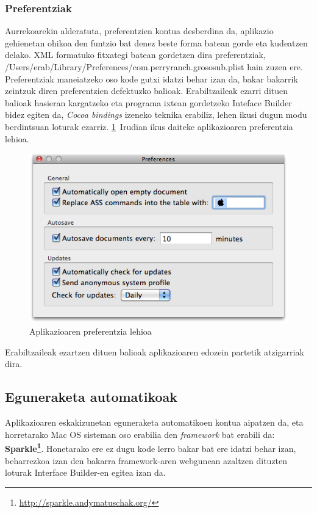 \subsubsection{Preferentziak}
Aurrekoarekin alderatuta, preferentzien kontua desberdina da, aplikazio gehienetan ohikoa den funtzio bat denez beste forma batean gorde eta kudeatzen delako. XML formatuko fitxategi batean gordetzen dira preferentziak, /Users/erab/Library/Preferences/com.perryranch.grososub.plist hain zuzen ere. Preferentziak maneiatzeko oso kode gutxi idatzi behar izan da, bakar bakarrik zeintzuk diren preferentzien defektuzko balioak. Erabiltzaileak ezarri dituen balioak hasieran kargatzeko eta programa ixtean gordetzeko Inteface Builder bidez egiten da, \textit{Cocoa bindings} izeneko teknika erabiliz, lehen ikusi dugun modu berdintsuan loturak ezarriz. \ref{prefs}~Irudian ikus daiteke aplikazioaren preferentzia lehioa.
\begin{figure}[htp]
\begin{center}
\includegraphics[scale=0.6]{Pictures/Chapter4/Inplementazioa/prefs.png}
\caption{Aplikazioaren preferentzia lehioa}
\label{prefs}
\end{center}
\end{figure}

Erabiltzaileak ezartzen dituen balioak aplikazioaren edozein partetik atzigarriak dira.

\subsection{Eguneraketa automatikoak}
Aplikazioaren eskakizunetan eguneraketa automatikoen kontua aipatzen da, eta horretarako Mac OS sisteman oso erabilia den \textit{framework} bat erabili da: \textbf{Sparkle\footnote{\url{http://sparkle.andymatuschak.org/}}}. Honetarako ere ez dugu kode lerro bakar bat ere idatzi behar izan, beharrezkoa izan den bakarra framework-aren webgunean azaltzen dituzten loturak Interface Builder-en egitea izan da.

